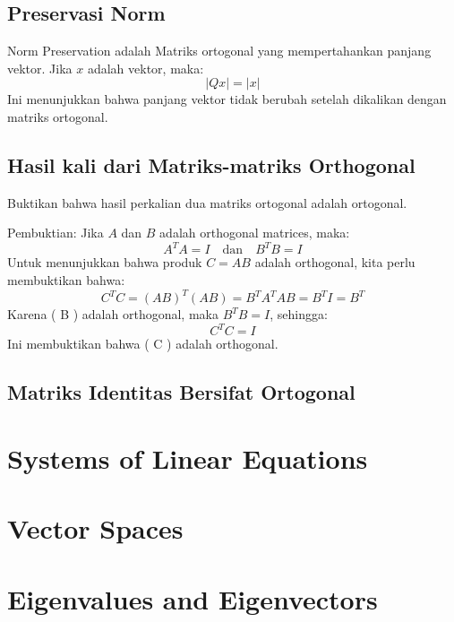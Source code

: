 \documentclass{article}
\begin{document}
\subsection{Preservasi Norm}
Norm Preservation adalah Matriks ortogonal yang mempertahankan panjang vektor. Jika \( x \) adalah vektor, maka: \[ | Qx | = | x | \] Ini menunjukkan bahwa panjang vektor tidak berubah setelah dikalikan dengan matriks ortogonal.

\subsection{Hasil kali dari Matriks-matriks Orthogonal}
Buktikan bahwa hasil perkalian dua matriks ortogonal adalah ortogonal.

Pembuktian:
Jika \( A \) dan \( B \) adalah orthogonal matrices, maka:
\[
    A^T A = I \quad \text{dan} \quad B^T B = I
\]
Untuk menunjukkan bahwa produk \( C = AB \) adalah orthogonal, kita perlu membuktikan bahwa:
\[
    C^T C = (AB)^T (AB) = B^T A^T AB = B^T I = B^T
\]
Karena ( B ) adalah orthogonal, maka \( B^T B = I \), sehingga:
\[
    C^T C = I
\]
Ini membuktikan bahwa ( C ) adalah orthogonal.

\subsection{Matriks Identitas Bersifat Ortogonal}









\newpage

\section{Systems of Linear Equations}

\newpage

\section{Vector Spaces}

\newpage

\section{Eigenvalues and Eigenvectors}


\end{document}
